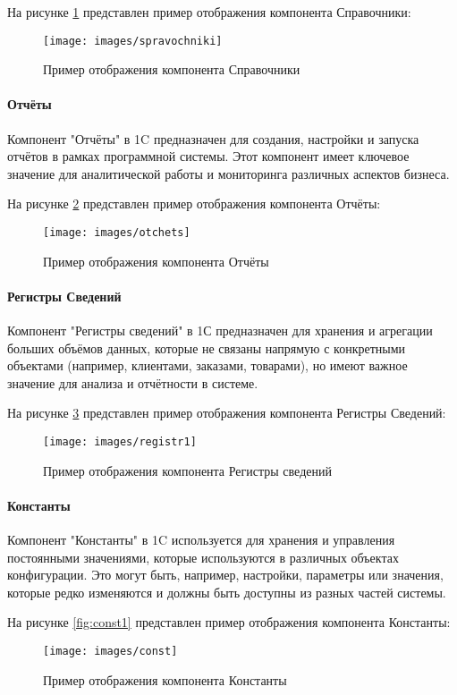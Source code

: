 На рисунке \ref{fig:spravochniki} представлен пример отображения компонента Справочники:
\begin{figure}
	\centering
	\texttt{[image: images/spravochniki]}
	\caption{Пример отображения компонента Справочники}
	\label{fig:spravochniki}
\end{figure}

\paragraph{Отчёты}

Компонент "Отчёты" в 1C предназначен для создания, настройки и запуска отчётов в рамках программной системы. Этот компонент имеет ключевое значение для аналитической работы и мониторинга различных аспектов бизнеса.

На рисунке \ref{fig:otchets} представлен пример отображения компонента Отчёты:

\begin{figure}
	\centering
	\texttt{[image: images/otchets]}
	\caption{Пример отображения компонента Отчёты}
	\label{fig:otchets}
\end{figure}

\paragraph{Регистры Сведений}

Компонент "Регистры сведений" в 1С предназначен для хранения и агрегации больших объёмов данных, которые не связаны напрямую с конкретными объектами (например, клиентами, заказами, товарами), но имеют важное значение для анализа и отчётности в системе.

На рисунке \ref{fig:registr1} представлен пример отображения компонента Регистры Сведений:
\begin{figure}
	\centering
	\texttt{[image: images/registr1]}
	\caption{Пример отображения компонента Регистры сведений}
	\label{fig:registr1}
\end{figure}

\paragraph{Константы}

Компонент "Константы" в 1C используется для хранения и управления постоянными значениями, которые используются в различных объектах конфигурации. Это могут быть, например, настройки, параметры или значения, которые редко изменяются и должны быть доступны из разных частей системы.

На рисунке \ref{fig:const1} представлен пример отображения компонента Константы:
\begin{figure}
	\centering
	\texttt{[image: images/const]}
	\caption{Пример отображения компонента Константы}
	\label{fig:const}
\end{figure}